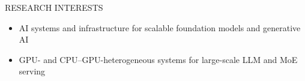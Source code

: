 \documentclass{resume} %
\begin{document}

\begin{rSection}{RESEARCH INTERESTS}
\begin{itemize}[left=0pt, labelsep=0.5em, itemsep=0pt, topsep=0pt]
\item AI systems and infrastructure for scalable foundation models and generative AI
\item GPU- and CPU–GPU-heterogeneous systems for large-scale LLM and MoE serving
\end{itemize}
\end{rSection}
\vspace{-0.5em}

\end{document}
